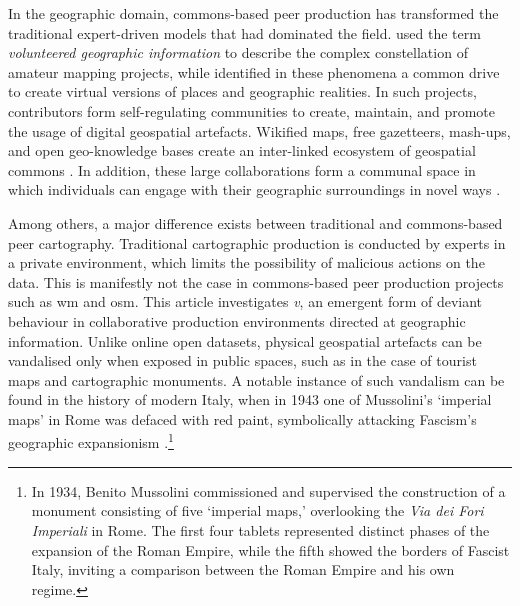 \documentclass{article} \usepackage{graphicx,xspace}
\begin{document}
In the geographic domain, commons-based peer production has transformed the traditional expert-driven models that had dominated the field.
\cite{Goodchild:2007:citizens} used the term \emph{volunteered geographic information} to describe the complex constellation of amateur mapping projects,
while \cite{graham:2010:neogeography} identified in these phenomena a common drive to create virtual versions of places and geographic realities. 
In such projects, contributors form self-regulating communities to create, maintain, and promote the usage of digital geospatial artefacts.
Wikified maps, free gazetteers, mash-ups, and open geo-knowledge bases create an inter-linked ecosystem of geospatial commons \citep{Ballatore:2012:survey}.
In addition, these large collaborations form a communal space in which individuals can engage with their geographic surroundings in novel ways \citep{elwood:2008:volunteered}.

Among others, a major difference exists between traditional and commons-based peer cartography.
Traditional cartographic production is conducted by experts in a private environment, which limits the possibility of malicious actions on the data.
This is manifestly not the case in commons-based peer production projects such as \gls{wm} and \gls{osm}.
This article investigates \emph{\gls{v}}, an emergent form of deviant behaviour in collaborative production environments directed at geographic information.
Unlike online open datasets, physical geospatial artefacts can be vandalised only when exposed in public spaces, such as in the case of tourist maps and cartographic monuments.
A notable instance of such vandalism can be found in the history of modern Italy, when in 1943 one of Mussolini's `imperial maps' in Rome was defaced with red paint, symbolically attacking Fascism's geographic expansionism \citep{minor:1999:mussolini}.\footnote{In 1934, Benito Mussolini commissioned and supervised the construction of a monument consisting of five `imperial maps,' overlooking the \emph{Via dei Fori Imperiali} in Rome.
The first four tablets represented distinct phases of the expansion of the Roman Empire, while the fifth showed the borders of Fascist Italy, inviting a comparison between the Roman Empire and his own regime.} 
\end{document}
